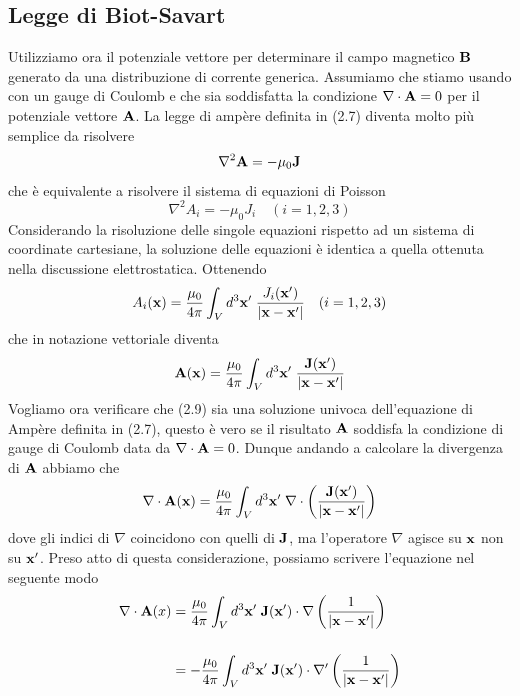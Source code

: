 \subsection{Legge di Biot-Savart}

Utilizziamo ora il potenziale vettore per determinare il campo magnetico $\bold{B}$ generato da una distribuzione di corrente generica. Assumiamo che stiamo usando con un gauge di Coulomb e che sia soddisfatta la condizione $\nabla \cdot \bold{A} =0 $ per il potenziale vettore $\bold{A}$. La legge di amp\`ere definita in (2.7) diventa molto pi\`u semplice da risolvere
\begin{equation}
	\nabla^2 \bold{A} = - \mu_0 \bold{J}
\end{equation}
che \`e equivalente a risolvere il sistema di equazioni di Poisson 
\begin{equation*}
	\nabla^2 A_i = -\mu_0J_i \quad (i=1,2,3)
\end{equation*}
Considerando la risoluzione delle singole equazioni rispetto ad un sistema di coordinate cartesiane, la soluzione delle equazioni \`e identica a quella ottenuta nella discussione elettrostatica. Ottenendo
\begin{equation*}
	A_i(\bold{x}) = \frac{\mu_0}{4 \pi} \int_{V} d^3\bold{x}' \; \frac{J_i(\bold{x}')}{|\bold{x}-\bold{x}'|} \quad (i =1,2,3)
\end{equation*}
che in notazione vettoriale diventa
\begin{equation}
	\bold{A}(\bold{x}) = \frac{\mu_0}{4 \pi} \int_{V} d^3\bold{x}' \; \frac{\bold{J}(\bold{x}')}{|\bold{x} - \bold{x}'|}
\end{equation}
Vogliamo ora verificare che (2.9) sia una soluzione univoca dell'equazione di Amp\`ere definita in (2.7), questo \`e vero se il risultato $\bold{A}$ soddisfa la condizione di gauge di Coulomb data da $\nabla \cdot \bold{A} =0$. Dunque andando a calcolare la divergenza di $\bold{A}$ abbiamo che
\begin{equation*}
	\nabla \cdot \bold{A}(\bold{x}) = \frac{\mu_0}{4\pi} \int_{V} d^3\bold{x}' \; \nabla \cdot \left ( \frac{\bold{J}(\bold{x}')}{|\bold{x}-\bold{x}'|}\right)
\end{equation*}
dove gli indici di $\nabla$ coincidono con quelli di $\bold{J}$, ma l'operatore $\nabla$ agisce su $\bold{x}$ non su $\bold{x}'$. Preso atto di questa considerazione, possiamo scrivere l'equazione nel seguente modo
\begin{align*}
	\nabla \cdot \bold{A}(x) & = \frac{\mu_0}{4 \pi} \int_{V} d^3\bold{x}' \; \bold{J}(\bold{x}') \cdot \nabla \left( \frac{1}{|\bold{x} -\bold{x}'|} \right)\\[0.5cm]
	& = - \frac{\mu_0}{4\pi} \int_V d^3\bold{x}' \; \bold{J}(\bold{x}') \cdot \nabla' \left( \frac{1}{|\bold{x} -\bold{x}'|} \right) 
\end{align*}
